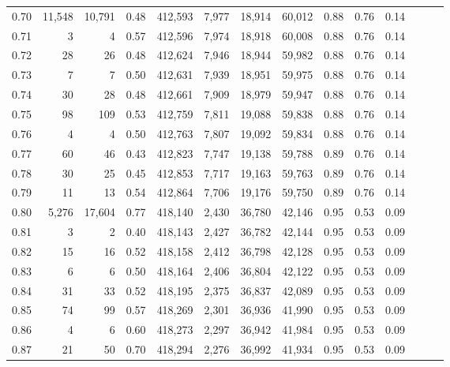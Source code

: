 \begin{tabular}{rrrrrrrrrrrrrr}
0.70 &  11,548 &  10,791 &  0.48 &  412,593 &    7,977 &  18,914 &  60,012 &  0.88 &  0.76 &      0.14 \\
0.71 &       3 &       4 &  0.57 &  412,596 &    7,974 &  18,918 &  60,008 &  0.88 &  0.76 &      0.14 \\
0.72 &      28 &      26 &  0.48 &  412,624 &    7,946 &  18,944 &  59,982 &  0.88 &  0.76 &      0.14 \\
0.73 &       7 &       7 &  0.50 &  412,631 &    7,939 &  18,951 &  59,975 &  0.88 &  0.76 &      0.14 \\
0.74 &      30 &      28 &  0.48 &  412,661 &    7,909 &  18,979 &  59,947 &  0.88 &  0.76 &      0.14 \\
0.75 &      98 &     109 &  0.53 &  412,759 &    7,811 &  19,088 &  59,838 &  0.88 &  0.76 &      0.14 \\
0.76 &       4 &       4 &  0.50 &  412,763 &    7,807 &  19,092 &  59,834 &  0.88 &  0.76 &      0.14 \\
0.77 &      60 &      46 &  0.43 &  412,823 &    7,747 &  19,138 &  59,788 &  0.89 &  0.76 &      0.14 \\
0.78 &      30 &      25 &  0.45 &  412,853 &    7,717 &  19,163 &  59,763 &  0.89 &  0.76 &      0.14 \\
0.79 &      11 &      13 &  0.54 &  412,864 &    7,706 &  19,176 &  59,750 &  0.89 &  0.76 &      0.14 \\
0.80 &   5,276 &  17,604 &  0.77 &  418,140 &    2,430 &  36,780 &  42,146 &  0.95 &  0.53 &      0.09 \\
0.81 &       3 &       2 &  0.40 &  418,143 &    2,427 &  36,782 &  42,144 &  0.95 &  0.53 &      0.09 \\
0.82 &      15 &      16 &  0.52 &  418,158 &    2,412 &  36,798 &  42,128 &  0.95 &  0.53 &      0.09 \\
0.83 &       6 &       6 &  0.50 &  418,164 &    2,406 &  36,804 &  42,122 &  0.95 &  0.53 &      0.09 \\
0.84 &      31 &      33 &  0.52 &  418,195 &    2,375 &  36,837 &  42,089 &  0.95 &  0.53 &      0.09 \\
0.85 &      74 &      99 &  0.57 &  418,269 &    2,301 &  36,936 &  41,990 &  0.95 &  0.53 &      0.09 \\
0.86 &       4 &       6 &  0.60 &  418,273 &    2,297 &  36,942 &  41,984 &  0.95 &  0.53 &      0.09 \\
0.87 &      21 &      50 &  0.70 &  418,294 &    2,276 &  36,992 &  41,934 &  0.95 &  0.53 &      0.09 \\

\end{tabular}
